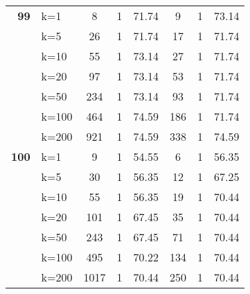 \begin{table}[htbp]
\begin{tabular}{|l|l|c|c|c|c|c|c|}
    \multicolumn{1}{|r|}{\textbf{99}} & k=1 & 8 & 1 & 71.74 & 9 & 1 & 73.14 \\ 
     & k=5 & 26 & 1 & 71.74 & 17 & 1 & 71.74 \\ 
     & k=10 & 55 & 1 & 73.14 & 27 & 1 & 71.74 \\ 
     & k=20 & 97 & 1 & 73.14 & 53 & 1 & 71.74 \\ 
     & k=50 & 234 & 1 & 73.14 & 93 & 1 & 71.74 \\ 
     & k=100 & 464 & 1 & 74.59 & 186 & 1 & 71.74 \\ 
     & k=200 & 921 & 1 & 74.59 & 338 & 1 & 74.59 \\ \hline
    \multicolumn{1}{|r|}{\textbf{100}} & k=1 & 9 & 1 & 54.55 & 6 & 1 & 56.35 \\ 
     & k=5 & 30 & 1 & 56.35 & 12 & 1 & 67.25 \\ 
     & k=10 & 55 & 1 & 56.35 & 19 & 1 & 70.44 \\ 
     & k=20 & 101 & 1 & 67.45 & 35 & 1 & 70.44 \\ 
     & k=50 & 243 & 1 & 67.45 & 71 & 1 & 70.44 \\ 
     & k=100 & 495 & 1 & 70.22 & 134 & 1 & 70.44 \\ 
     & k=200 & 1017 & 1 & 70.44 & 250 & 1 & 70.44 \\ \hline
    \end{tabular}
\end{table}